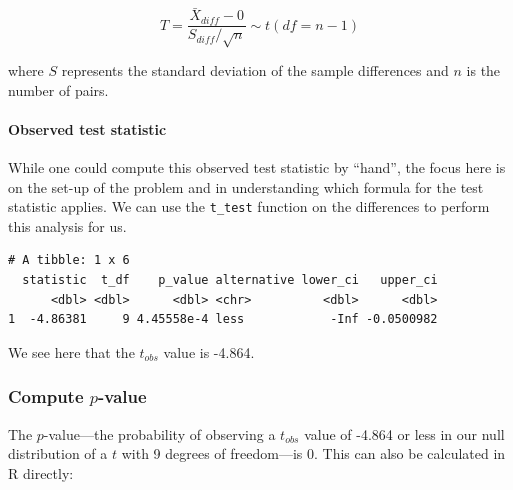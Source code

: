 \documentclass[12pt, krantz2,]{krantz}
\makeatletter
\newenvironment{Shaded}{\begin{snugshade}}{\end{snugshade}}
\newcommand{\DataTypeTok}[1]{\textcolor[rgb]{0.27,0.27,0.27}{#1}}
\newcommand{\DecValTok}[1]{\textcolor[rgb]{0.06,0.06,0.06}{#1}}
\newcommand{\KeywordTok}[1]{\textcolor[rgb]{0.27,0.27,0.27}{\textbf{#1}}}
\newcommand{\NormalTok}[1]{#1}
\newcommand{\OperatorTok}[1]{\textcolor[rgb]{0.43,0.43,0.43}{\textbf{#1}}}
\newcommand{\OtherTok}[1]{\textcolor[rgb]{0.37,0.37,0.37}{#1}}
\newcommand{\StringTok}[1]{\textcolor[rgb]{0.5,0.5,0.5}{#1}}
\let\oldparagraph\paragraph
\renewcommand{\paragraph}[1]{\oldparagraph{#1}\mbox{}}
\newenvironment{kframe}{%
\medskip{}
\setlength{\fboxsep}{.8em}
 \def\at@end@of@kframe{}%
 \ifinner\ifhmode%
  \def\at@end@of@kframe{\end{minipage}}%
  \begin{minipage}{\columnwidth}%
 \fi\fi%
 \def\FrameCommand##1{\hskip\@totalleftmargin \hskip-\fboxsep
 \colorbox{shadecolor}{##1}\hskip-\fboxsep
     \hskip-\linewidth \hskip-\@totalleftmargin \hskip\columnwidth}%
 \MakeFramed {\advance\hsize-\width
   \@totalleftmargin\z@ \linewidth\hsize
   \@setminipage}}%
 {\par\unskip\endMakeFramed%
 \at@end@of@kframe}
\renewenvironment{Shaded}{\begin{kframe}}{\end{kframe}}
\makeatother
\begin{document}
\[ T =\dfrac{ \bar{X}_{diff} - 0}{ S_{diff} / \sqrt{n} } \sim t (df = n - 1) \]

where \(S\) represents the standard deviation of the sample differences and \(n\) is the number of pairs.

\hypertarget{observed-test-statistic-4}{%
\paragraph{Observed test statistic}\label{observed-test-statistic-4}}

While one could compute this observed test statistic by ``hand'', the focus here is on the set-up of the problem and in understanding which formula for the test statistic applies. We can use the \texttt{t\_test} function on the differences to perform this analysis for us.

\begin{Shaded}
\end{Shaded}

\begin{verbatim}
# A tibble: 1 x 6
  statistic  t_df    p_value alternative lower_ci   upper_ci
      <dbl> <dbl>      <dbl> <chr>          <dbl>      <dbl>
1  -4.86381     9 4.45558e-4 less            -Inf -0.0500982
\end{verbatim}

We see here that the \(t_{obs}\) value is -4.864.

\hypertarget{compute-p-value-2}{%
\subsubsection*{\texorpdfstring{Compute \(p\)-value}{Compute p-value}}\label{compute-p-value-2}}


The \(p\)-value---the probability of observing a \(t_{obs}\) value of -4.864 or less in our null distribution of a \(t\) with 9 degrees of freedom---is 0. This can also be calculated in R directly:
\end{document}
